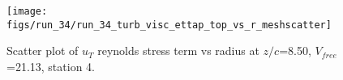 \begin{figure}[H]
\centering
\texttt{[image: figs/run\_34/run\_34\_turb\_visc\_ettap\_top\_vs\_r\_meshscatter]}
\caption{Scatter plot of $
u_T$ reynolds stress term vs radius at $z/c$=8.50, $V_{free}$=21.13, station 4.}
\label{fig:run_34_turb_visc_ettap_top_vs_r_meshscatter}
\end{figure}


